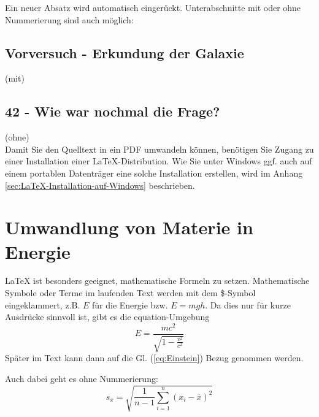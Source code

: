 \documentclass[a4paper,10pt]{report}
\begin{document}
	Ein neuer Absatz wird automatisch eingerückt. Unterabschnitte mit oder 
	ohne Nummerierung sind auch möglich:
	
	\subsection{Vorversuch - Erkundung der Galaxie}
	
	(mit)
	
	\subsection*{42 - Wie war nochmal die Frage?}
	
	(ohne)\\
	
	Damit Sie den Quelltext in ein PDF umwandeln können, benötigen Sie Zugang zu
	einer Installation einer LaTeX-Distribution. Wie Sie unter Windows ggf. auch auf
	einem portablen Datenträger eine solche Installation erstellen, wird im Anhang
	\ref{sec:LaTeX-Installation-auf-Windows} beschrieben.
	
	\newpage 
	
	
	\section{Umwandlung von Materie in Energie}
	
	\LaTeX{} ist besonders geeignet, mathematische Formeln zu setzen. 
	Mathematische Symbole oder Terme im laufenden Text werden mit dem \$-Symbol
	eingeklammert, z.B. $E$ für die Energie bzw. $E=mgh$. Da dies nur für
	kurze Ausdrücke sinnvoll ist, gibt es die equation-Umgebung 
	\begin{equation}
	E = \frac{m c^2}{\sqrt{1-\frac{v^2}{c^2}}}
	\label{eq:Einstein}
	\end{equation}
	Später im Text kann dann auf die Gl. (\ref{eq:Einstein}) 
	Bezug genommen werden.
	
	Auch dabei geht es ohne Nummerierung:
	$$
	s_x = \sqrt{\frac{1}{n - 1} \sum_{i=1}^n{\left( x_i - \overline{x} \right)^2 }}
	$$
	
\end{document}

